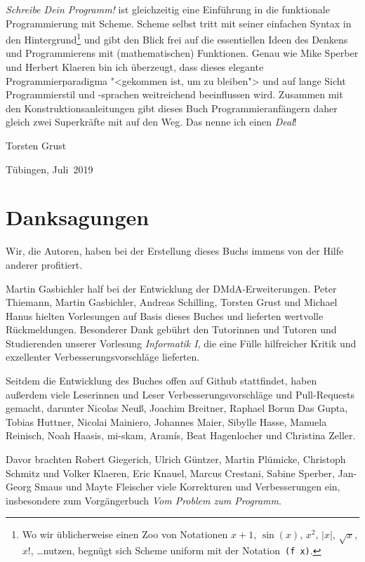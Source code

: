 \textit{Schreibe Dein Programm!} ist gleichzeitig eine Einführung in die
funktionale Programmierung mit Scheme.  Scheme selbst tritt mit seiner
einfachen Syntax in den Hintergrund\footnote{Wo wir üblicherweise einen
Zoo von Notationen $x+1$, $\sin(x)$, $x^2$, $\vert x\vert$, $\sqrt{x}$,
$x!$, \dots nutzen, begnügt sich Scheme uniform mit der
Notation~\texttt{(f~x)}.} und gibt den Blick frei auf die essentiellen
Ideen des Denkens und Programmierens mit (mathematischen) Funktionen.
Genau wie Mike Sperber und Herbert Klaeren bin ich überzeugt, dass
dieses elegante Programmierparadigma "<gekommen ist, um zu bleiben"> und
auf lange Sicht Programmierstil und -sprachen weitreichend beeinflussen
wird.  Zusammen mit den Konstruktionsanleitungen gibt dieses Buch
Programmieranfängern daher gleich zwei Superkräfte mit auf den Weg.  Das
nenne ich einen \emph{Deal}!

\begin{flushright}
  Torsten Grust

  Tübingen, Juli~2019
\end{flushright}

\section*{Danksagungen}

Wir, die Autoren, haben bei der Erstellung dieses Buchs immens von der
Hilfe anderer profitiert.  

Martin Gasbichler half bei der Entwicklung der DMdA-Erweiterungen.
Peter Thiemann, Martin Gasbichler, Andreas Schilling, Torsten Grust und Michael Hanus hielten
Vorlesungen auf Basis dieses Buches und lieferten wertvolle Rückmeldungen.
Besonderer Dank gebührt den Tutorinnen und Tutoren und Studierenden unserer Vorlesung
\textit{Informatik I}, die eine
Fülle hilfreicher Kritik und exzellenter Verbesserungsvorschläge
lieferten.

Seitdem die Entwicklung des Buches offen auf Github stattfindet, haben
außerdem viele Leserinnen und Leser Verbesserungsvorschläge und
Pull-Requests gemacht, darunter Nicolas Neuß, Joachim Breitner,
Raphael Borun Das Gupta, Tobias Huttner, Nicolai Mainiero, Johannes
Maier, Sibylle Hasse, Manuela Reinisch, Noah Haasis, mi-skam,
Aramís, Beat Hagenlocher und Christina Zeller.

Davor brachten Robert Giegerich, Ulrich Güntzer, Martin Plümicke,
Christoph Schmitz und Volker Klaeren, Eric Knauel, Marcus Crestani,
Sabine Sperber, Jan-Georg Smaus und Mayte Fleischer viele Korrekturen
und Verbesserungen ein, insbesondere zum Vorgängerbuch \textit{Vom
  Problem zum Programm}.

